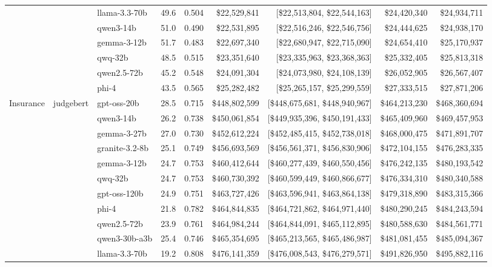 \begin{table}[t]
\begin{tabular}{lllrrrrrr}
   &  & llama-3.3-70b & 49.6 & 0.504 & \$22,529,841 & [\$22,513,804, \$22,544,163] & \$24,420,340 & \$24,934,711 \\
   &  & qwen3-14b & 51.0 & 0.490 & \$22,531,895 & [\$22,516,246, \$22,546,756] & \$24,444,625 & \$24,938,170 \\
   &  & gemma-3-12b & 51.7 & 0.483 & \$22,697,340 & [\$22,680,947, \$22,715,090] & \$24,654,410 & \$25,170,937 \\
   &  & qwq-32b & 48.5 & 0.515 & \$23,351,640 & [\$23,335,963, \$23,368,363] & \$25,332,405 & \$25,813,318 \\
   &  & qwen2.5-72b & 45.2 & 0.548 & \$24,091,304 & [\$24,073,980, \$24,108,139] & \$26,052,905 & \$26,567,407 \\
   &  & phi-4 & 43.5 & 0.565 & \$25,282,482 & [\$25,265,157, \$25,299,559] & \$27,333,515 & \$27,871,206 \\
\midrule
  Insurance & judgebert & gpt-oss-20b & 28.5 & 0.715 & \$448,802,599 & [\$448,675,681, \$448,940,967] & \$464,213,230 & \$468,360,694 \\
   &  & qwen3-14b & 26.2 & 0.738 & \$450,061,854 & [\$449,935,396, \$450,191,433] & \$465,409,960 & \$469,457,953 \\
   &  & gemma-3-27b & 27.0 & 0.730 & \$452,612,224 & [\$452,485,415, \$452,738,018] & \$468,000,475 & \$471,891,707 \\
   &  & granite-3.2-8b & 25.1 & 0.749 & \$456,693,569 & [\$456,561,371, \$456,830,906] & \$472,104,155 & \$476,283,335 \\
   &  & gemma-3-12b & 24.7 & 0.753 & \$460,412,644 & [\$460,277,439, \$460,550,456] & \$476,242,135 & \$480,193,542 \\
   &  & qwq-32b & 24.7 & 0.753 & \$460,730,392 & [\$460,599,449, \$460,866,677] & \$476,334,310 & \$480,340,588 \\
   &  & gpt-oss-120b & 24.9 & 0.751 & \$463,727,426 & [\$463,596,941, \$463,864,138] & \$479,318,890 & \$483,315,366 \\
   &  & phi-4 & 21.8 & 0.782 & \$464,844,835 & [\$464,721,862, \$464,971,440] & \$480,290,245 & \$484,243,594 \\
   &  & qwen2.5-72b & 23.9 & 0.761 & \$464,984,244 & [\$464,844,091, \$465,112,895] & \$480,588,630 & \$484,561,771 \\
   &  & qwen3-30b-a3b & 25.4 & 0.746 & \$465,354,695 & [\$465,213,565, \$465,486,987] & \$481,081,455 & \$485,094,367 \\
   &  & llama-3.3-70b & 19.2 & 0.808 & \$476,141,359 & [\$476,008,543, \$476,279,571] & \$491,826,950 & \$495,882,116 \\

\end{tabular}
\end{table}
